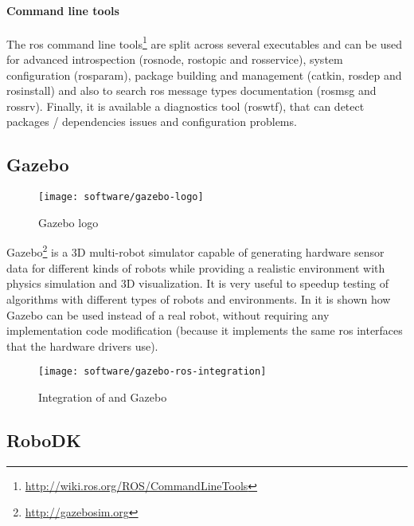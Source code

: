 \paragraph{Command line tools}

The \gls{ros} command line tools\footnote{\url{http://wiki.ros.org/ROS/CommandLineTools}} are split across several executables and can be used for advanced introspection (rosnode, rostopic and rosservice), system configuration (rosparam), package building and management (catkin, rosdep and rosinstall) and also to search \gls{ros} message types documentation (rosmsg and rossrv). Finally, it is available a diagnostics tool (roswtf), that can detect packages / dependencies issues and configuration problems.


\subsection{Gazebo}

\begin{wrapfigure}{r}{0.23\textwidth}
	\centering
	\vspace*{-2em}
	\texttt{[image: software/gazebo-logo]}
	\caption{Gazebo logo}
	\label{fig:gazebo-logo}
\end{wrapfigure}


Gazebo\footnote{\url{http://gazebosim.org}} is a 3D multi-robot simulator capable of generating hardware sensor data for different kinds of robots while providing a realistic environment with physics simulation and 3D visualization. It is very useful to speedup testing of algorithms with different types of robots and environments. In  it is shown how Gazebo can be used instead of a real robot, without requiring any implementation code modification (because it implements the same \gls{ros} interfaces that the hardware drivers use).

\begin{figure}[H]
	\centering
	\texttt{[image: software/gazebo-ros-integration]}
	\caption[Integration of  and Gazebo]{Integration of  and Gazebo\protect\footnotemark}
	\label{fig:gazebo-ros-integration}
\end{figure}


\subsection{RoboDK}


